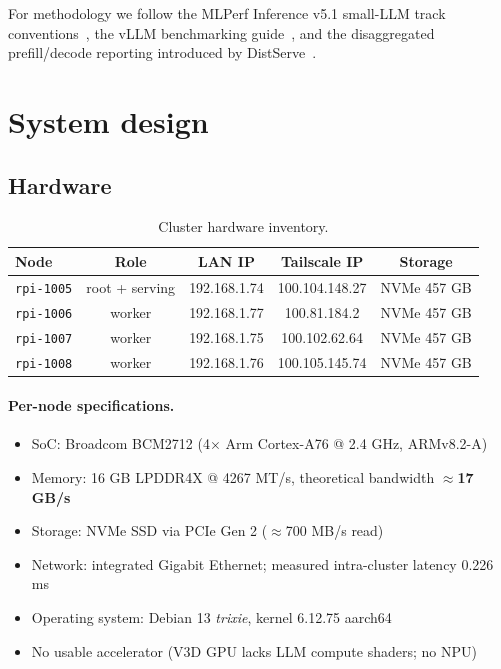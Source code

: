 \documentclass[11pt,a4paper]{article}
\begin{document}
For methodology we follow the MLPerf Inference v5.1 small-LLM track conventions~\cite{mlperf2025}, the vLLM benchmarking guide~\cite{kwon2023vllm}, and the disaggregated prefill/decode reporting introduced by DistServe~\cite{zhong2024distserve}.

\section{System design}

\subsection{Hardware}

\begin{table}[H]
\centering
\caption{Cluster hardware inventory.}
\small
\begin{tabular}{lcccc}
\toprule
\textbf{Node} & \textbf{Role} & \textbf{LAN IP} & \textbf{Tailscale IP} & \textbf{Storage} \\
\midrule
\texttt{rpi-1005} & root + serving & 192.168.1.74 & 100.104.148.27 & NVMe 457 GB \\
\texttt{rpi-1006} & worker        & 192.168.1.77 & 100.81.184.2   & NVMe 457 GB \\
\texttt{rpi-1007} & worker        & 192.168.1.75 & 100.102.62.64  & NVMe 457 GB \\
\texttt{rpi-1008} & worker        & 192.168.1.76 & 100.105.145.74 & NVMe 457 GB \\
\bottomrule
\end{tabular}
\end{table}

\paragraph{Per-node specifications.}
\begin{itemize}[leftmargin=*,nosep]
  \item SoC: Broadcom BCM2712 (4$\times$ Arm Cortex-A76 @ 2.4 GHz, ARMv8.2-A)
  \item Memory: 16 GB LPDDR4X @ 4267 MT/s, theoretical bandwidth $\approx$\textbf{17 GB/s}
  \item Storage: NVMe SSD via PCIe Gen 2 ($\approx$700 MB/s read)
  \item Network: integrated Gigabit Ethernet; measured intra-cluster latency 0.226 ms
  \item Operating system: Debian 13 \emph{trixie}, kernel 6.12.75 aarch64
  \item No usable accelerator (V3D GPU lacks LLM compute shaders; no NPU)
\end{itemize}
\end{document}
